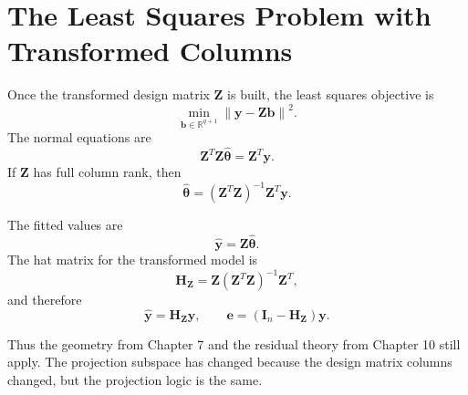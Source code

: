 \section{The Least Squares Problem with Transformed Columns}

Once the transformed design matrix \(\mathbf{Z}\) is built, the least squares objective is
\begin{equation}
  \min_{\mathbf{b}\in\mathbb{R}^{q+1}}
  \left\|\mathbf{y}-\mathbf{Z}\mathbf{b}\right\|^2.
\end{equation}
The normal equations are
\begin{equation}
  \mathbf{Z}^T\mathbf{Z}\widehat{\boldsymbol{\theta}}
  =\mathbf{Z}^T\mathbf{y}.
\end{equation}
If \(\mathbf{Z}\) has full column rank, then
\begin{equation}
  \boxed{
  \widehat{\boldsymbol{\theta}}
  = (\mathbf{Z}^T\mathbf{Z})^{-1}\mathbf{Z}^T\mathbf{y}.
  }
  \label{eq:ch11-theta-hat}
\end{equation}

The fitted values are
\begin{equation}
  \widehat{\mathbf{y}}=\mathbf{Z}\widehat{\boldsymbol{\theta}}.
\end{equation}
The hat matrix for the transformed model is
\begin{equation}
  \mathbf{H}_{\mathbf{Z}}
  =\mathbf{Z}(\mathbf{Z}^T\mathbf{Z})^{-1}\mathbf{Z}^T,
\end{equation}
and therefore
\begin{equation}
  \widehat{\mathbf{y}}=\mathbf{H}_{\mathbf{Z}}\mathbf{y},
  \qquad
  \mathbf{e}=(\mathbf{I}_n-\mathbf{H}_{\mathbf{Z}})\mathbf{y}.
\end{equation}

Thus the geometry from Chapter 7 and the residual theory from Chapter 10 still apply.  The projection subspace has changed because the design matrix columns changed, but the projection logic is the same.

